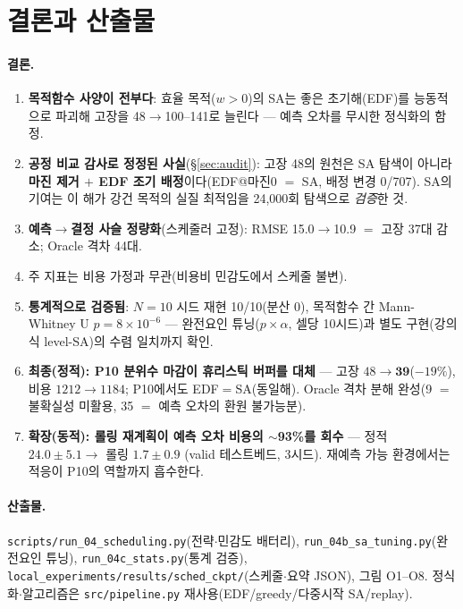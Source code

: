 \documentclass[11pt]{article}
\begin{document}
\section{결론과 산출물}

\paragraph{결론.}
\begin{enumerate}[nosep]
  \item \textbf{목적함수 사양이 전부다}: 효율 목적($w{>}0$)의 SA는 좋은 초기해(EDF)를 능동적으로 파괴해
        고장을 48$\to$100--141로 늘린다 — 예측 오차를 무시한 정식화의 함정.
  \item \textbf{공정 비교 감사로 정정된 사실}(\S\ref{sec:audit}): 고장 48의 원천은 SA 탐색이 아니라
        \textbf{마진 제거 $+$ EDF 조기 배정}이다(EDF@마진0 $=$ SA, 배정 변경 0/707).
        SA의 기여는 이 해가 강건 목적의 실질 최적임을 24{,}000회 탐색으로 \emph{검증}한 것.
  \item \textbf{예측$\to$결정 사슬 정량화}(스케줄러 고정): RMSE 15.0$\to$10.9 $=$ 고장 37대 감소; Oracle 격차 44대.
  \item 주 지표는 비용 가정과 무관(비용비 민감도에서 스케줄 불변).
  \item \textbf{통계적으로 검증됨}: $N{=}10$ 시드 재현 10/10(분산 0), 목적함수 간 Mann-Whitney U $p{=}8{\times}10^{-6}$ —
        완전요인 튜닝($p\times\alpha$, 셀당 10시드)과 별도 구현(강의식 level-SA)의 수렴 일치까지 확인.
  \item \textbf{최종(정적): P10 분위수 마감이 휴리스틱 버퍼를 대체} — 고장 $48\to\mathbf{39}$($-19\%$), 비용 $1212\to1184$;
        P10에서도 EDF$=$SA(동일해). Oracle 격차 분해 완성(9 $=$ 불확실성 미활용, 35 $=$ 예측 오차의 환원 불가능분).
  \item \textbf{확장(동적): 롤링 재계획이 예측 오차 비용의 $\sim$93\%를 회수} — 정적 $24.0\pm5.1 \to$ 롤링 $1.7\pm0.9$
        (valid 테스트베드, 3시드). 재예측 가능 환경에서는 적응이 P10의 역할까지 흡수한다.
\end{enumerate}

\paragraph{산출물.}
\texttt{scripts/run\_04\_scheduling.py}(전략$\cdot$민감도 배터리),
\texttt{run\_04b\_sa\_tuning.py}(완전요인 튜닝), \texttt{run\_04c\_stats.py}(통계 검증),
\texttt{local\_experiments/results/sched\_ckpt/}(스케줄$\cdot$요약 JSON),
그림 O1--O8.
정식화$\cdot$알고리즘은 \texttt{src/pipeline.py} 재사용(EDF/greedy/다중시작 SA/replay).
\end{document}
